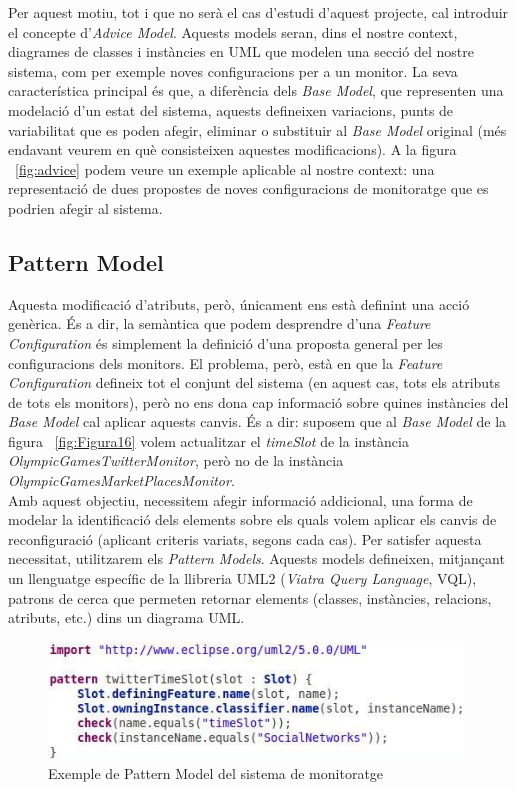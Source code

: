 Per aquest motiu, tot i que no serà el cas d'estudi d'aquest projecte, cal introduir el concepte d'\textit{Advice Model}. Aquests models seran, dins el nostre context, diagrames de classes i instàncies en UML que modelen una secció del nostre sistema, com per exemple noves configuracions per a un monitor. La seva característica principal és que, a diferència dels \textit{Base Model}, que representen una modelació d'un estat del sistema, aquests defineixen variacions, punts de variabilitat que es poden afegir, eliminar o substituir al \textit{Base Model} original (més endavant veurem en què consisteixen aquestes modificacions). A la figura ~\ref{fig:advice} podem veure un exemple aplicable al nostre context: una representació de dues propostes de noves configuracions de monitoratge que es podrien afegir al sistema.

\subsection{Pattern Model}

Aquesta modificació d'atributs, però, únicament ens està definint una acció genèrica. És a dir, la semàntica que podem desprendre d'una \textit{Feature Configuration} és simplement la definició d'una proposta general per les configuracions dels monitors. El problema, però, està en que la \textit{Feature Configuration} defineix tot el conjunt del sistema (en aquest cas, tots els atributs de tots els monitors), però no ens dona cap informació sobre quines instàncies del \textit{Base Model} cal aplicar aquests canvis. És a dir: suposem que al \textit{Base Model} de la figura ~\ref{fig:Figura16} volem actualitzar el \textit{timeSlot} de la instància \textit{OlympicGamesTwitterMonitor}, però no de la instància \textit{OlympicGamesMarketPlacesMonitor}.\\

Amb aquest objectiu, necessitem afegir informació addicional, una forma de modelar la identificació dels elements sobre els quals volem aplicar els canvis de reconfiguració (aplicant criteris variats, segons cada cas). Per satisfer aquesta necessitat, utilitzarem els \textit{Pattern Models}. Aquests models defineixen, mitjançant un llenguatge específic de la llibreria UML2 (\textit{Viatra Query Language}, VQL), patrons de cerca que permeten retornar elements (classes, instàncies, relacions, atributs, etc.) dins un diagrama UML.\\ 

\begin{figure}
\centering
\includegraphics[width=11cm]{Figures/Figure19}
\decoRule
\caption{Exemple de Pattern Model del sistema de monitoratge}
\label{fig:Figura19}
\end{figure}

